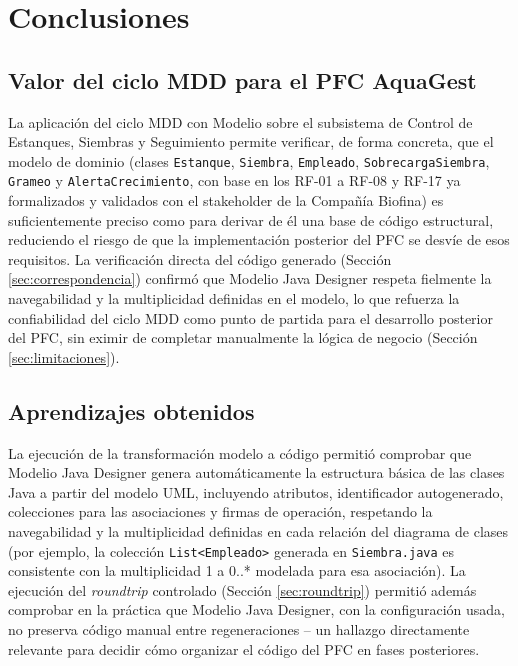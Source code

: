 \documentclass[11pt,a4paper]{article}
\begin{document}
\section{Conclusiones}
\label{sec:conclusiones}

\subsection{Valor del ciclo MDD para el PFC AquaGest}
La aplicación del ciclo MDD con Modelio sobre el subsistema de Control de
Estanques, Siembras y Seguimiento permite verificar, de forma concreta, que el
modelo de dominio (clases \texttt{Estanque}, \texttt{Siembra}, \texttt{Empleado},
\texttt{SobrecargaSiembra}, \texttt{Grameo} y \texttt{AlertaCrecimiento}, con
base en los RF-01 a RF-08 y RF-17 ya formalizados y validados con el stakeholder
de la Compañía Biofina) es suficientemente preciso como para derivar de él una
base de código estructural, reduciendo el riesgo de que la implementación
posterior del PFC se desvíe de esos requisitos. La verificación directa del
código generado (Sección \ref{sec:correspondencia}) confirmó que Modelio Java
Designer respeta fielmente la navegabilidad y la multiplicidad definidas en el
modelo, lo que refuerza la confiabilidad del ciclo MDD como punto de partida
para el desarrollo posterior del PFC, sin eximir de completar manualmente la
lógica de negocio (Sección \ref{sec:limitaciones}).

\subsection{Aprendizajes obtenidos}

La ejecución de la transformación modelo a código permitió comprobar que
Modelio Java Designer genera automáticamente la estructura básica de las clases
Java a partir del modelo UML, incluyendo atributos, identificador autogenerado,
colecciones para las asociaciones y firmas de operación, respetando la
navegabilidad y la multiplicidad definidas en cada relación del diagrama de
clases (por ejemplo, la colección \texttt{List<Empleado>} generada en
\texttt{Siembra.java} es consistente con la multiplicidad 1 a 0..* modelada
para esa asociación). La ejecución del \textit{roundtrip} controlado (Sección
\ref{sec:roundtrip}) permitió además comprobar en la práctica que Modelio Java
Designer, con la configuración usada, no preserva código manual entre
regeneraciones -- un hallazgo directamente relevante para decidir cómo
organizar el código del PFC en fases posteriores.
\end{document}
